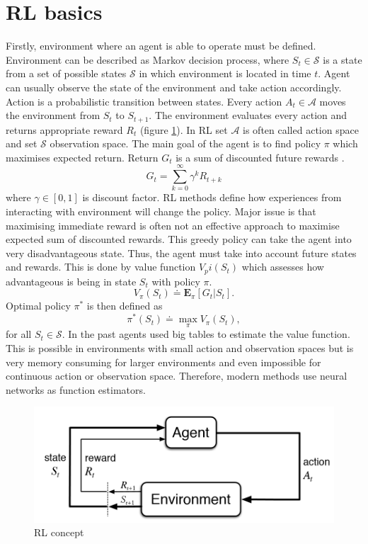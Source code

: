 \section{RL basics}
Firstly, environment where an agent is able to operate must be defined. Environment can be described as Markov decision process, where $S_t \in \mathcal{S}$ is a state from a set of possible states $\mathcal{S}$ in which environment is located in time $t$. Agent can usually observe the state of the environment and take action accordingly. Action is a probabilistic transition between states. Every action $A_t \in \mathcal{A}$ moves the environment from $S_t$ to $S_{t+1}$. The environment evaluates every action and returns appropriate reward $R_t$ (figure \ref{fig:rlconcept}). In RL set $\mathcal{A}$ is often called action space and set $\mathcal{S}$ observation space. The main goal of the agent is to find policy $\pi$ which maximises expected return. Return $G_t$ is a sum of discounted future rewards \cite{sutton2012}.
\begin{equation}
G_t = \sum\limits_{k=0}^{\infty}\gamma^k R_{t+k}
\end{equation}
where $\gamma \in [0,1]$ is discount factor. RL methods define how experiences from interacting with environment will change the policy.  Major issue is that maximising immediate reward is often not an effective approach to maximise expected sum of discounted rewards. This greedy policy can take the agent into very disadvantageous state. Thus, the agent must take into account future states and rewards. This is done by value function $V_pi(S_t)$ which assesses how advantageous is being in state $S_t$ with policy $\pi$.
\begin{equation}
V_\pi(S_t) \doteq  \mathbf{E}_\pi[G_t | S_t].
\end{equation}
Optimal policy $\pi^*$ is then defined as
\begin{equation}
\pi^*(S_t) \doteq \max\limits_\pi V_\pi(S_t),
\end{equation}
for all $S_t \in \mathcal{S}$.
In the past agents used big tables to estimate the value function. This is possible in environments with small action and observation spaces but is very memory consuming for larger environments and even impossible for continuous action or observation space. Therefore, modern methods use neural networks as function estimators.

\begin{figure}[!h]
\centering
\includegraphics[scale=0.3]{fig/RL-concept.png}
\caption{RL concept}
\label{fig:rlconcept}
\end{figure}

